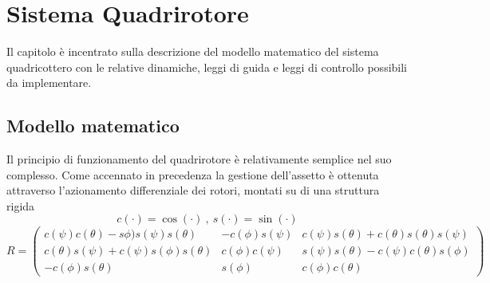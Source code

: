 \chapter{Sistema Quadrirotore}
Il capitolo è incentrato sulla descrizione del modello matematico del sistema quadricottero con le relative dinamiche, leggi di guida e leggi di controllo possibili da implementare.
\section{Modello matematico}
Il principio di funzionamento del quadrirotore è relativamente semplice nel suo complesso. Come accennato in precedenza la gestione dell'assetto è ottenuta attraverso l'azionamento differenziale dei rotori, montati su di una struttura rigida \cite{modelquad}
\[ 	c(\cdot)=\cos(\cdot)\ ,\  s(\cdot) = \sin(\cdot) \]
\begin{equation}
R=
	\begin{pmatrix}
	c(\psi)c(\theta)-s\phi)s(\psi)s(\theta) & -c(\phi)s(\psi) & c(\psi)s(\theta)+c(\theta)s(\theta)s(\psi) \\ 
	c(\theta) s(\psi)+c(\psi)s(\phi)s(\theta) & c(\phi)c(\psi) & s(\psi)s(\theta)-c(\psi)c(\theta)s(\phi) \\ 
	-c(\phi)s(\theta)	& s(\phi) & c(\phi)c(\theta)
	\end{pmatrix}
\end{equation}
